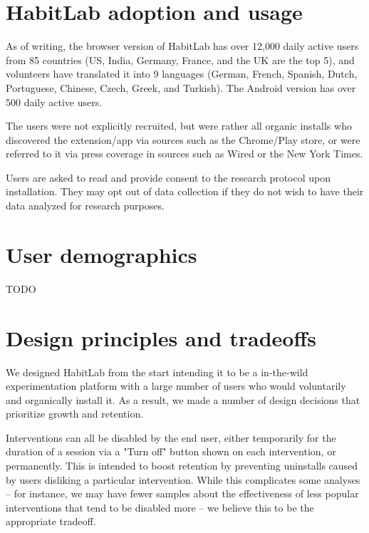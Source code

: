 \section{HabitLab adoption and usage}

As of writing, the browser version of HabitLab has over 12,000 daily active users from 85 countries (US, India, Germany, France, and the UK are the top 5), and volunteers have translated it into 9 languages (German, French, Spanish, Dutch, Portuguese, Chinese, Czech, Greek, and Turkish). The Android version has over 500 daily active users.

The users were not explicitly recruited, but were rather all organic installs who discovered the extension/app via sources such as the Chrome/Play store, or were referred to it via press coverage in sources such as Wired or the New York Times.


Users are asked to read and provide consent to the research protocol upon installation. They may opt out of data collection if they do not wish to have their data analyzed for research purposes.

\section{User demographics}

TODO

\section{Design principles and tradeoffs}

We designed HabitLab from the start intending it to be a in-the-wild experimentation platform with a large number of users who would voluntarily and organically install it. As a result, we made a number of design decisions that prioritize growth and retention.

Interventions can all be disabled by the end user, either temporarily for the duration of a session via a "Turn off" button shown on each intervention, or permanently. This is intended to boost retention by preventing uninstalls caused by users disliking a particular intervention. While this complicates some analyses -- for instance, we may have fewer samples about the effectiveness of less popular interventions that tend to be disabled more -- we believe this to be the appropriate tradeoff.

